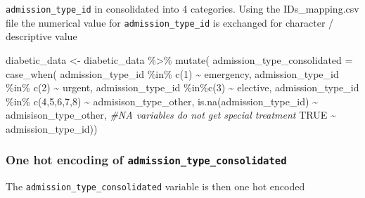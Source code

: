 \documentclass[
]{article}
\newenvironment{Shaded}{\begin{snugshade}}{\end{snugshade}}
\newcommand{\AttributeTok}[1]{\textcolor[rgb]{0.77,0.63,0.00}{#1}}
\newcommand{\CommentTok}[1]{\textcolor[rgb]{0.56,0.35,0.01}{\textit{#1}}}
\newcommand{\ConstantTok}[1]{\textcolor[rgb]{0.00,0.00,0.00}{#1}}
\newcommand{\DecValTok}[1]{\textcolor[rgb]{0.00,0.00,0.81}{#1}}
\newcommand{\FunctionTok}[1]{\textcolor[rgb]{0.00,0.00,0.00}{#1}}
\newcommand{\NormalTok}[1]{#1}
\newcommand{\OtherTok}[1]{\textcolor[rgb]{0.56,0.35,0.01}{#1}}
\newcommand{\SpecialCharTok}[1]{\textcolor[rgb]{0.00,0.00,0.00}{#1}}
\newcommand{\StringTok}[1]{\textcolor[rgb]{0.31,0.60,0.02}{#1}}
\begin{document}
\texttt{admission\_type\_id} in consolidated into 4 categories. Using
the IDs\_mapping.csv file the numerical value for
\texttt{admission\_type\_id} is exchanged for character / descriptive
value

\begin{Shaded}
\begin{Highlighting}[]
\NormalTok{diabetic\_data }\OtherTok{\textless{}{-}}\NormalTok{ diabetic\_data }\SpecialCharTok{\%\textgreater{}\%}
  \FunctionTok{mutate}\NormalTok{(}
    \AttributeTok{admission\_type\_consolidated =} \FunctionTok{case\_when}\NormalTok{(}
\NormalTok{      admission\_type\_id }\SpecialCharTok{\%in\%} \FunctionTok{c}\NormalTok{(}\DecValTok{1}\NormalTok{) }\SpecialCharTok{\textasciitilde{}} \StringTok{\textquotesingle{}emergency\textquotesingle{}}\NormalTok{,}
\NormalTok{      admission\_type\_id }\SpecialCharTok{\%in\%} \FunctionTok{c}\NormalTok{(}\DecValTok{2}\NormalTok{) }\SpecialCharTok{\textasciitilde{}} \StringTok{\textquotesingle{}urgent\textquotesingle{}}\NormalTok{,}
\NormalTok{      admission\_type\_id }\SpecialCharTok{\%in\%}\FunctionTok{c}\NormalTok{(}\DecValTok{3}\NormalTok{) }\SpecialCharTok{\textasciitilde{}} \StringTok{\textquotesingle{}elective\textquotesingle{}}\NormalTok{,}
\NormalTok{      admission\_type\_id }\SpecialCharTok{\%in\%} \FunctionTok{c}\NormalTok{(}\DecValTok{4}\NormalTok{,}\DecValTok{5}\NormalTok{,}\DecValTok{6}\NormalTok{,}\DecValTok{7}\NormalTok{,}\DecValTok{8}\NormalTok{) }\SpecialCharTok{\textasciitilde{}} \StringTok{\textquotesingle{}admisison\_type\_other\textquotesingle{}}\NormalTok{,}
      \FunctionTok{is.na}\NormalTok{(admission\_type\_id) }\SpecialCharTok{\textasciitilde{}} \StringTok{\textquotesingle{}admisison\_type\_other\textquotesingle{}}\NormalTok{, }\CommentTok{\#NA variables do not get special treatment}
      \ConstantTok{TRUE} \SpecialCharTok{\textasciitilde{}}\NormalTok{ admission\_type\_id))}
\end{Highlighting}
\end{Shaded}

\hypertarget{one-hot-encoding-of-admission_type_consolidated}{%
\subsubsection{\texorpdfstring{One hot encoding of
\texttt{admission\_type\_consolidated}}{One hot encoding of admission\_type\_consolidated}}\label{one-hot-encoding-of-admission_type_consolidated}}

The \texttt{admission\_type\_consolidated} variable is then one hot
encoded
\end{document}
